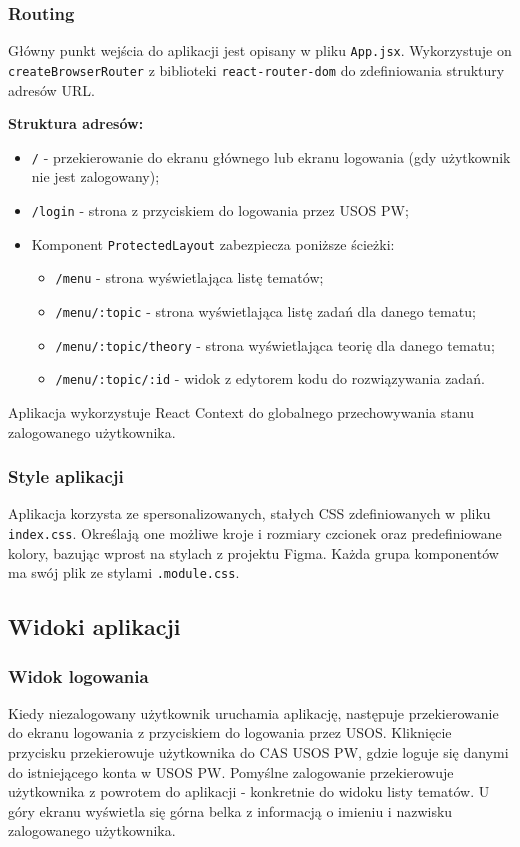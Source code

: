 \documentclass[12pt,a4paper]{article}
\begin{document}
\subsubsection{Routing}
Główny punkt wejścia do aplikacji jest opisany w pliku \texttt{App.jsx}. Wykorzystuje on \texttt{createBrowserRouter} z biblioteki \texttt{react-router-dom} do zdefiniowania struktury adresów URL.

\textbf{Struktura adresów:}
\begin{itemize}
    \item \texttt{/} - przekierowanie do ekranu głównego lub ekranu logowania (gdy użytkownik nie jest zalogowany);
    \item \texttt{/login} - strona z przyciskiem do logowania przez USOS PW;
    \item Komponent \texttt{ProtectedLayout} zabezpiecza poniższe ścieżki:
    \begin{itemize}
        \item \texttt{/menu} - strona wyświetlająca listę tematów;
        \item \texttt{/menu/:topic} - strona wyświetlająca listę zadań dla danego tematu;
        \item \texttt{/menu/:topic/theory} - strona wyświetlająca teorię dla danego tematu;
        \item \texttt{/menu/:topic/:id} - widok z edytorem kodu do rozwiązywania zadań.
    \end{itemize}
\end{itemize}

Aplikacja wykorzystuje React Context do globalnego przechowywania stanu zalogowanego użytkownika.

\subsubsection{Style aplikacji}
Aplikacja korzysta ze spersonalizowanych, stałych CSS zdefiniowanych w pliku \texttt{index.css}. Określają one możliwe kroje i rozmiary czcionek oraz predefiniowane kolory, bazując wprost na stylach z projektu Figma. Każda grupa komponentów ma swój plik ze stylami \texttt{.module.css}.

\subsection{Widoki aplikacji}
\subsubsection{Widok logowania}
Kiedy niezalogowany użytkownik uruchamia aplikację, następuje przekierowanie do ekranu logowania z przyciskiem do logowania przez USOS. Kliknięcie przycisku przekierowuje użytkownika do CAS USOS PW, gdzie loguje się danymi do istniejącego konta w USOS PW. Pomyślne zalogowanie przekierowuje użytkownika z powrotem do aplikacji - konkretnie do widoku listy tematów. U góry ekranu wyświetla się górna belka z informacją o imieniu i nazwisku zalogowanego użytkownika. 
\end{document}
